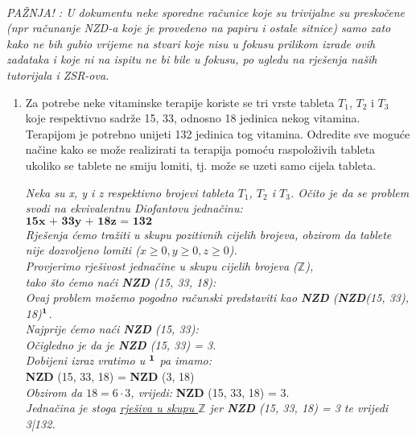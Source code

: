 \documentclass[12pt]{article}
\begin{document}
    
    \\
    \begin{center}
    \textit{PAŽNJA! : U dokumentu neke sporedne računice koje su trivijalne su preskočene (npr računanje NZD-a koje je provedeno na papiru i ostale sitnice) samo zato kako ne bih gubio vrijeme na stvari koje nisu u fokusu prilikom izrade ovih zadataka i koje ni na ispitu ne bi bile u fokusu, po ugledu na rješenja naših tutorijala i ZSR-ova.}
    \end{center}
    \vspace{0.5cm}
	\begin{enumerate}
		\item Za potrebe neke vitaminske terapije koriste se tri vrste tableta $T_1$, $T_2$ i $T_3$ koje respektivno sadrže 15, 33, odnosno 18 jedinica nekog vitamina. Terapijom je potrebno unijeti 132 jedinica tog vitamina. Odredite sve moguće načine kako se može realizirati ta terapija pomoću raspoloživih tableta ukoliko se tablete ne smiju lomiti, tj. može se uzeti samo cijela tableta.
        \begin{center}
        \textit{Neka su x, y i z respektivno brojevi tableta $T_1$, $T_2$ i $T_3$. Očito je da se problem svodi na ekvivalentnu Diofantovu jednačinu:\\ $\textbf{15x + 33y + 18z = 132}$\\Rješenja ćemo tražiti u skupu pozitivnih cijelih brojeva, obzirom da tablete nije dozvoljeno lomiti ($x \geq 0, y \geq 0, z \geq 0$).\\Provjerimo rješivost jednačine u skupu cijelih brojeva ($\mathbb{Z}$), \\tako što ćemo naći \textbf{NZD} (15, 33, 18):\\Ovaj problem možemo pogodno računski predstaviti kao \textbf{NZD} (\textbf{NZD}(15, 33), 18)$\bf{^1}$. \\Najprije ćemo naći \textbf{NZD} (15, 33):\\}
         \textit{Očigledno je da je \textbf{NZD} (15, 33) = 3.\\}
        \vspace*{0.25cm}
        \textit{Dobijeni izraz vratimo u $\bf{^1}$ pa imamo:} \\
        \textbf{NZD} (15, 33, 18) $\textit{=}$ \textbf{NZD} (3, 18)\\
        \textit{Obzirom da $18 = 6\cdot3$, vrijedi:} \textbf{NZD} (15, 33, 18) = 3.\\
        \textit{Jednačina je stoga \underline{rješiva u skupu $\mathbb{Z}$} jer \textbf{NZD} (15, 33, 18) = 3 te vrijedi 3|132.} \\

\end{center}
\end{enumerate}
\end{document}
